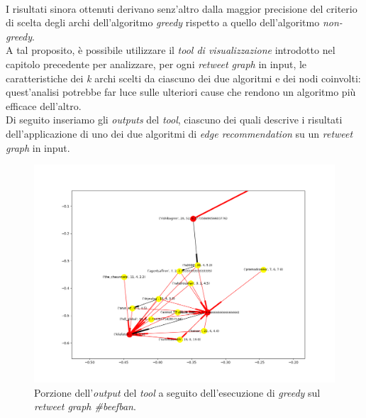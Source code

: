 \\I risultati sinora ottenuti derivano senz'altro dalla maggior precisione del criterio di scelta degli archi dell'algoritmo \textit{greedy} rispetto a quello dell'algoritmo \textit{non-greedy}. 
\\A tal proposito, è possibile utilizzare il \textit{tool di visualizzazione} introdotto nel capitolo precedente per analizzare, per ogni \textit{retweet graph} in input, le caratteristiche dei \textit{k} archi scelti da ciascuno dei due algoritmi e dei nodi coinvolti: quest'analisi potrebbe far luce sulle ulteriori cause che rendono un algoritmo più efficace dell'altro. 
\\Di seguito inseriamo gli \textit{outputs} del \textit{tool}, ciascuno dei quali descrive i risultati dell'applicazione di uno dei due algoritmi di \textit{edge recommendation} su un \textit{retweet graph} in input.

\begin{figure}
\begin{center}
\includegraphics[scale=0.5]{images/beefban_in_degree_greedy_probability_free.png}
\end{center}
\caption{Porzione dell'\textit{output} del \textit{tool} a seguito dell'esecuzione di \textit{greedy} sul \textit{retweet graph \#beefban}.}
\label{fig:beefgreedy}
\end{figure}

